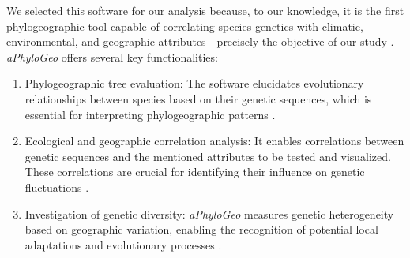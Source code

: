 We selected this software for our analysis because, to our knowledge, it is the first phylogeographic tool capable of correlating species genetics with climatic, environmental, and geographic attributes - precisely the objective of our study \citep{koshkarov_phylogeography_2022}. \textit{aPhyloGeo} offers several  key functionalities:

\begin{enumerate}[label=\arabic*.]
\item Phylogeographic tree evaluation: The software elucidates evolutionary relationships between species based on their genetic sequences, which is essential for interpreting phylogeographic patterns \citep{koshkarov_phylogeography_2022}.
\item Ecological and geographic correlation analysis: It enables correlations between genetic sequences and the mentioned attributes to be tested and visualized. These correlations are crucial for identifying their influence on genetic fluctuations \citep{koshkarov_phylogeography_2022}.
\item Investigation of genetic diversity: \textit{aPhyloGeo} measures genetic heterogeneity based on geographic variation, enabling the recognition of potential local adaptations and evolutionary processes \citep{manel_perspectives_2010}.
\end{enumerate}

